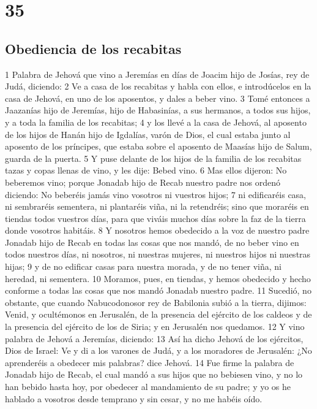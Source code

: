 \chapter{35}

\section*{Obediencia de los recabitas}

1 Palabra de Jehová que vino a Jeremías en días de Joacim hijo de Josías, rey de Judá, diciendo:
2 Ve a casa de los recabitas y habla con ellos, e introdúcelos en la casa de Jehová, en uno de los aposentos, y dales a beber vino.
3 Tomé entonces a Jaazanías hijo de Jeremías, hijo de Habasinías, a sus hermanos, a todos sus hijos, y a toda la familia de los recabitas;
4 y los llevé a la casa de Jehová, al aposento de los hijos de Hanán hijo de Igdalías, varón de Dios, el cual estaba junto al aposento de los príncipes, que estaba sobre el aposento de Maasías hijo de Salum, guarda de la puerta.
5 Y puse delante de los hijos de la familia de los recabitas tazas y copas llenas de vino, y les dije: Bebed vino.
6 Mas ellos dijeron: No beberemos vino; porque Jonadab hijo de Recab nuestro padre nos ordenó diciendo: No beberéis jamás vino vosotros ni vuestros hijos;
7 ni edificaréis casa, ni sembraréis sementera, ni plantaréis viña, ni la retendréis; sino que moraréis en tiendas todos vuestros días, para que viváis muchos días sobre la faz de la tierra donde vosotros habitáis.
8 Y nosotros hemos obedecido a la voz de nuestro padre Jonadab hijo de Recab en todas las cosas que nos mandó, de no beber vino en todos nuestros días, ni nosotros, ni nuestras mujeres, ni nuestros hijos ni nuestras hijas;
9 y de no edificar casas para nuestra morada, y de no tener viña, ni heredad, ni sementera.
10 Moramos, pues, en tiendas, y hemos obedecido y hecho conforme a todas las cosas que nos mandó Jonadab nuestro padre.
11 Sucedió, no obstante, que cuando Nabucodonosor rey de Babilonia subió a la tierra, dijimos: Venid, y ocultémonos en Jerusalén, de la presencia del ejército de los caldeos y de la presencia del ejército de los de Siria; y en Jerusalén nos quedamos.
12 Y vino palabra de Jehová a Jeremías, diciendo:
13 Así ha dicho Jehová de los ejércitos, Dios de Israel: Ve y di a los varones de Judá, y a los moradores de Jerusalén: ¿No aprenderéis a obedecer mis palabras? dice Jehová.
14 Fue firme la palabra de Jonadab hijo de Recab, el cual mandó a sus hijos que no bebiesen vino, y no lo han bebido hasta hoy, por obedecer al mandamiento de su padre; y yo os he hablado a vosotros desde temprano y sin cesar, y no me habéis oído.
